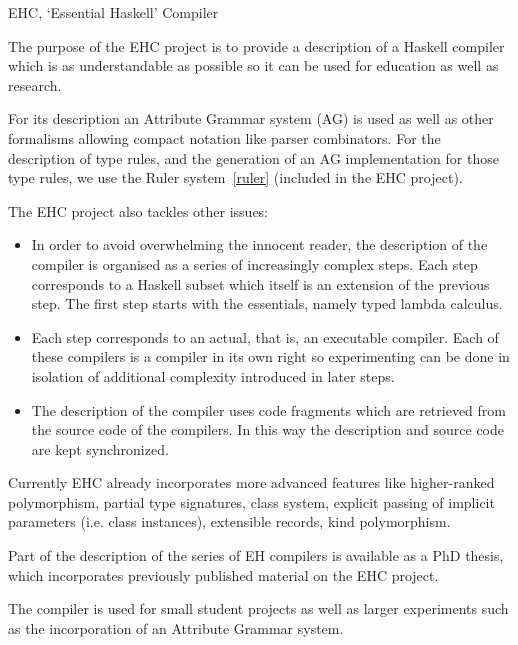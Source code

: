 \begin{hcarentry}{EHC, `Essential Haskell' Compiler}
\label{ehc}
\makeheader

The purpose of the EHC project is to provide a description of a Haskell
compiler which is as understandable as possible so it can be used for
education as well as research.

For its description an Attribute Grammar system (AG) is used as well as other
formalisms allowing compact notation like parser combinators.  For the
description of type rules, and the generation of an AG implementation for
those type rules, we use the Ruler system~\cref{ruler}
(included in the EHC project).

The EHC project also tackles other issues:
\begin{itemize}
\item
   In order to avoid overwhelming the innocent reader,
   the description of the compiler is organised as a series of
   increasingly complex steps.
   Each step corresponds to a Haskell subset which itself is an extension
   of the previous step.
   The first step starts with the essentials, namely typed lambda
   calculus.

\item
   Each step corresponds to an actual, that is, an executable compiler.
   Each of these compilers is a compiler in its own right so
   experimenting can be done in isolation of additional complexity
   introduced in later steps.

\item
   The description of the compiler uses code fragments which are
   retrieved from the source code of the compilers.
   In this way the description and source code are kept synchronized.
\end{itemize}

Currently EHC already incorporates more advanced features like
higher-ranked polymorphism, partial type signatures, class system,
explicit passing of implicit parameters (i.e. class instances),
extensible records, kind polymorphism.

Part of the description of the series of EH compilers is available
as a PhD thesis,
which incorporates previously published material on the EHC project.

The compiler is used for small student projects as well as larger
experiments such as the incorporation of an Attribute Grammar system.


\end{hcarentry}
